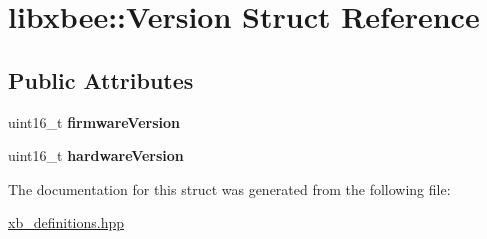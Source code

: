 \hypertarget{structlibxbee_1_1_version}{}\section{libxbee\+:\+:Version Struct Reference}
\label{structlibxbee_1_1_version}
\subsection*{Public Attributes}
\begin{DoxyCompactItemize}
\item 
\mbox{\label{structlibxbee_1_1_version_ad2ebf2c33042396e9865b7eec460bf9e}} 
uint16\+\_\+t {\bfseries firmware\+Version}
\item 
\mbox{\label{structlibxbee_1_1_version_a67ef00d03fbc2918b1f6b0380fc61650}} 
uint16\+\_\+t {\bfseries hardware\+Version}
\end{DoxyCompactItemize}


The documentation for this struct was generated from the following file\+:\begin{DoxyCompactItemize}
\item 
\mbox{\hyperlink{xb__definitions_8hpp}{xb\+\_\+definitions.\+hpp}}\end{DoxyCompactItemize}
